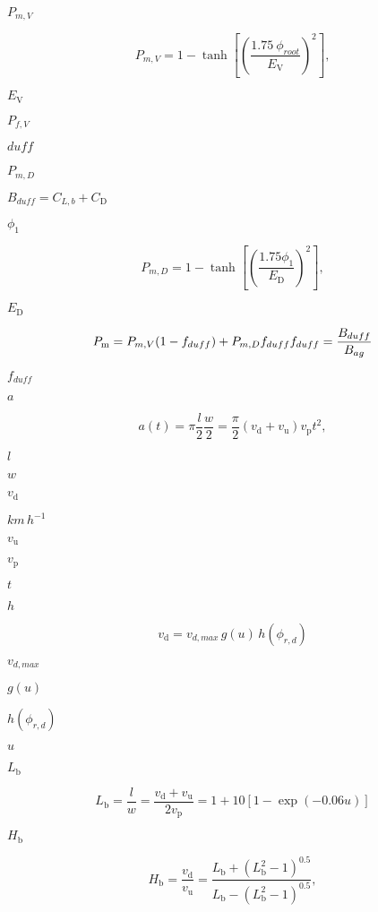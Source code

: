 \documentclass{article}
\begin{document}
$P_{m,V}$
\pagebreak

\[ P_{m,V} = 1-\tanh \left[\left( \frac{1.75\ \phi_{root}} {E_\mathrm{V}}\right )^2\right],\]
\pagebreak

$E_\mathrm{V}$
\pagebreak

$P_{f,V}$
\pagebreak

$\textit{duff}$
\pagebreak

$P_{m,D}$
\pagebreak

$B_{duff} = C_{L,b} + C_\mathrm{D}$
\pagebreak

$\phi_1$
\pagebreak

\[ P_{m,D} = 1 -\tanh\left[\left(\frac{1.75 \phi_1}{E_{\mathrm{D}}}\right)^2\right], \]
\pagebreak

$E_{\mathrm{D}}$
\pagebreak

\[ \label{eqn:Pf} P_\mathrm{m} = P_{m,V} (1-f_{duff}) + P_{m,D} f_{duff} \nonumber \\ f_{duff}=\frac{B_{duff}}{B_{ag}}\]
\pagebreak

$f_{duff}$
\pagebreak

$a$
\pagebreak

\[ a(t)=\pi \frac{l}{2}\frac{w}{2}= \frac{\pi}{2} (v_\mathrm{d}+v_\mathrm{u})v_\mathrm{p}t^2,\]
\pagebreak

$l$
\pagebreak

$w$
\pagebreak

$v_\mathrm{d}$
\pagebreak

$km\,h^{-1}$
\pagebreak

$v_\mathrm{u}$
\pagebreak

$v_\mathrm{p}$
\pagebreak

$t$
\pagebreak

$h$
\pagebreak

\[ \label{firespreadrate} v_\mathrm{d} = v_{d,max}\,g(u)\,h(\phi_{r, d})\]
\pagebreak

$v_{d,max}$
\pagebreak

$g(u)$
\pagebreak

$ h(\phi_{r, d})$
\pagebreak

$u$
\pagebreak

$L_\mathrm{b}$
\pagebreak

\[ \label{lb} L_\mathrm{b}= \frac{l}{w} = \frac{v_\mathrm{d} + v_\mathrm{u}}{2v_\mathrm{p}} = 1 + 10 [1 -\exp(-0.06 u)] \]
\pagebreak

$H_\mathrm{b}$
\pagebreak

\[ \label{hb} H_\mathrm{b} = \frac{v_\mathrm{d}}{v_\mathrm{u}} = \frac{L_\mathrm{b} + (L_\mathrm{b}^2 - 1)^{0.5}}{L_\mathrm{b} - (L_\mathrm{b}^2 - 1)^{0.5}}, \]
\pagebreak
\end{document}

